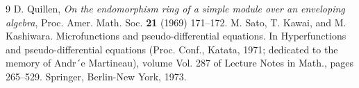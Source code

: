 \documentclass[12pt, a4paper]{amsart}
\begin{document}
\begin{thebibliography}{9}
{\sc D. Quillen},
{\em On the endomorphism ring of a simple module over an enveloping algebra},
Proc. Amer. Math. Soc. {\bf 21} (1969) 171--172.
 M. Sato, T. Kawai, and M. Kashiwara. Microfunctions and pseudo-differential equations. In Hyperfunctions and
pseudo-differential equations (Proc. Conf., Katata, 1971; dedicated to the memory of Andr´e Martineau), volume
Vol. 287 of Lecture Notes in Math., pages 265–529. Springer, Berlin-New York, 1973.

\end{thebibliography}
\end{document}
